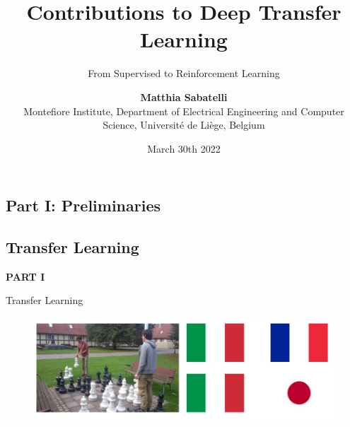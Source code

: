 \documentclass{beamer}
\title{Contributions to Deep Transfer Learning}
\subtitle{From Supervised to Reinforcement Learning}
\author{\textbf{Matthia Sabatelli} \\ Montefiore Institute, Department of Electrical Engineering and Computer Science, Universit\'e de Li\`ege, Belgium}
\date{March 30th 2022}
\begin{document}
\frame{\titlepage} 



\begin{frame}
	\section{Part I: Preliminaries}
	\subsection{Transfer Learning}

	\begin{center}
		\textcolor{skymagenta}{\textbf{PART I}}
	\end{center}
\end{frame}

\begin{frame}{Transfer Learning}
	\begin{figure}
		\includegraphics[width=1\textwidth]{figures/example}
	\end{figure}

\end{frame}
\end{document}
